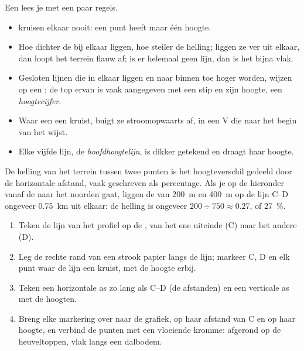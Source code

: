 Een  lees je met een paar regels.
\begin{itemize}
  \item {} kruisen elkaar nooit: een punt heeft maar één hoogte.
  \item Hoe dichter de  bij elkaar liggen, hoe steiler de
        helling; liggen ze ver uit elkaar, dan loopt het terrein flauw af;
        is er helemaal geen lijn, dan is het bijna vlak.
  \item Gesloten lijnen die in elkaar liggen en naar binnen toe hoger
        worden, wijzen op een ; de top ervan is vaak aangegeven met
        een stip en zijn hoogte, een \emph{hoogtecijfer}.
  \item Waar een  een  kruist, buigt ze stroomopwaarts af, in
        een V die naar het begin van het  wijst.
  \item Elke vijfde lijn, de \emph{hoofdhoogtelijn}, is dikker getekend en
        draagt haar hoogte.
\end{itemize}

De helling van het terrein tussen twee punten is het hoogteverschil
gedeeld door de horizontale afstand, vaak geschreven als percentage. Als je
op de  hieronder vanaf de  naar het noorden gaat, liggen de
 van \qty{200}{m} en \qty{400}{m} op de lijn C--D ongeveer
\qty{0.75}{km} uit elkaar: de helling is ongeveer $200 \div 750
\approx 0.27$, of \qty{27}{\%}.

\begin{method}
\begin{enumerate}
  \item Teken de lijn van het profiel op de , van het ene uiteinde (C)
        naar het andere (D).
  \item Leg de rechte rand van een strook papier langs de lijn; markeer C,
        D en elk punt waar de lijn een  kruist, met de hoogte
        erbij.
  \item Teken een horizontale as zo lang als C--D (de afstanden) en een
        verticale as met de hoogten.
  \item Breng elke markering over naar de grafiek, op haar afstand van C en
        op haar hoogte, en verbind de punten met een vloeiende kromme:
        afgerond op de heuveltoppen, vlak langs een dalbodem.
\end{enumerate}
\end{method}


